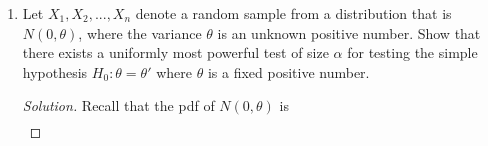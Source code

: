 \documentclass[12pt]{exam}
\begin{document}
\begin{enumerate}
\begin{enumerate}
        \item Find the GLRT of size \(\alpha\) of \(H_0: \theta = 1\) vs. \(H_1:\theta \neq 1\).
            \begin{proof}[Solution]
                First, we solve for the \(\theta_{MLE}\) using methods of moments. That is,
                \begin{align*}
                    L(\theta) &= \theta^n\prod_{i = 1}^n x_i^{\theta -1}
                    \\\ell(\theta) &= n\ln(\theta) + (\theta - 1)\sum_{i = 1}^n \ln x_i
                    \\\ell'(\theta) &= \dfrac{n}{\theta} + \sum_{i=1}^n \ln x_i
                    \\\theta_{MLE} &= -\dfrac{n}{\sum_{i=1}^n \ln x_i}
                \end{align*}
                For this instance, given we only have a single observation, \(\theta_{MLE} = -\dfrac{1}{\ln x}\). Moreover, we define \(\Omega_0 := \{\theta: \theta = 1\}\). Hence, 
                \begin{align*}
                    \sup_{\theta \in \Omega_0} L(\theta;x_i) = f(x;1) = 1
                \end{align*}
                Therefore,
                \begin{align*}
                    \lambda &= \dfrac{\sup_{\theta \in \Omega_0} L(\theta;x_i)}{\sup_{\theta \in \Omega} L(\theta;x_i)}
                    \\&= \dfrac{1}{L(\theta_{MLE})}
                    \\&= \dfrac{1}{-(1/\ln x)x^{-1/\ln x - 1}}
                    \\&= -\ln(x)x^{1/\ln x + 1}
                \end{align*}
                and we reject \(H_0\) if \(\lambda \leq \lambda_0\) for some \(\lambda_0 \in [0,1]\).
            \end{proof}
    \end{enumerate}
    \item Let \(X_1, X_2, . . . , X_n\) denote a random sample from a distribution that is \(N(0, \theta)\), where the variance \(\theta\) is an unknown positive number. Show that there exists a uniformly most powerful test of size \(\alpha\) for testing the simple hypothesis \(H_0 : \theta = \theta '\) where \(\theta\) is a fixed positive number.
    \begin{proof}[Solution]
        Recall that the pdf of \(N(0,\theta)\) is 
        \begin{align*}

\end{align*}
\end{proof}
\end{enumerate}
\end{document}
